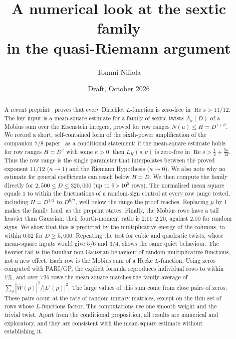 \documentclass[11pt]{article}
\title{A numerical look at the sextic family\\in the quasi-Riemann argument}
\author{Tommi Niilola}
\date{Draft, October 2026}
\theoremstyle{remark}
\begin{document}
\maketitle

\begin{abstract}
A recent preprint~\cite{OAI} proves that every Dirichlet $L$-function is zero-free in
$\operatorname{Re}s>11/12$. The key input is a mean-square estimate for a family of sextic
twists $A_u(D)$ of a Möbius sum over the Eisenstein integers, proved for row ranges
$N(u)\le H=D^{1+\vartheta}$. We record a short, self-contained form of the sixth-power
amplification of the companion $7/8$ paper~\cite[Lemma~17.6]{OAI78} as a conditional statement:
if the mean-square estimate holds for row ranges $H=D^\kappa$ with some $\kappa>0$, then
$L_K(s,\nu)$ is zero-free in $\operatorname{Re}s>\tfrac12+\tfrac{5\kappa}{12}$. Thus the row range is the single parameter that interpolates between the proved
exponent $11/12$ ($\kappa\to1$) and the Riemann Hypothesis ($\kappa\to0$). We also note why no
estimate for general coefficients can reach below $H=D$. We then compute the family directly for
$2{,}500\le D\le320{,}000$ (up to $9\times10^5$ rows). The normalised mean square equals $1$
to within the fluctuations of a random-sign control at every row range tested, including
$H=D^{1/2}$ to $D^{6/7}$, well below the range the proof reaches. Replacing $\mu$ by $1$
makes the family loud, as the preprint states. Finally, the Möbius rows have a tail
heavier than Gaussian: their fourth-moment ratio is $2.11$--$2.20$, against $2.00$ for
random signs. We show that this is predicted by the multiplicative energy of the columns, to
within $0.02$ for $D\ge5{,}000$. Repeating the test for cubic and quadratic twists, whose
mean-square inputs would give $5/6$ and $3/4$, shows the same quiet behaviour. The heavier tail is
the familiar non-Gaussian behaviour of random multiplicative functions, not a new effect.
Each row is the Möbius sum of a Hecke $L$-function. Using zeros computed with PARI/GP, the
explicit formula reproduces individual rows to within $1\%$, and over $726$ rows the mean square
matches the family average of $\sum_\rho|\widehat W(\rho)|^2/|L'(\rho)|^2$. The large values of this
sum come from close pairs of zeros. These pairs occur at the rate of random unitary matrices,
except on the thin set of rows whose $L$-functions factor. The computations use one smooth weight
and the trivial twist. Apart from the conditional proposition, all results are numerical and
exploratory, and they are consistent with the mean-square estimate without establishing it.
\end{abstract}
\end{document}
